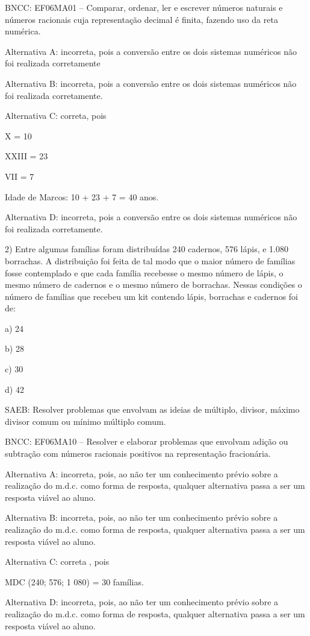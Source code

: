 BNCC: EF06MA01 -- Comparar, ordenar, ler e escrever números naturais e
números racionais cuja representação decimal é finita, fazendo uso da
reta numérica.

Alternativa A: incorreta, pois a conversão entre os dois sistemas
numéricos não foi realizada corretamente

Alternativa B: incorreta, pois a conversão entre os dois sistemas
numéricos não foi realizada corretamente.

Alternativa C: correta, pois

X = 10

XXIII = 23

VII = 7

Idade de Marcos: 10 + 23 + 7 = 40 anos.

Alternativa D: incorreta, pois a conversão entre os dois sistemas
numéricos não foi realizada corretamente.

2) Entre algumas famílias foram distribuídas 240 cadernos, 576 lápis, e
1.080 borrachas. A distribuição foi feita de tal modo que o maior número
de famílias fosse contemplado e que cada família recebesse o mesmo
número de lápis, o mesmo número de cadernos e o mesmo número de
borrachas. Nessas condições o número de famílias que recebeu um kit
contendo lápis, borrachas e cadernos foi de:

a) 24

b) 28

c) 30

d) 42

SAEB: Resolver problemas que envolvam as ideias de múltiplo, divisor,
máximo divisor comum ou mínimo múltiplo comum.

BNCC: EF06MA10 -- Resolver e elaborar problemas que envolvam adição ou
subtração com números racionais positivos na representação fracionária.

Alternativa A: incorreta, pois, ao não ter um conhecimento prévio sobre
a realização do m.d.c. como forma de resposta, qualquer alternativa
passa a ser um resposta viável ao aluno.

Alternativa B: incorreta, pois, ao não ter um conhecimento prévio sobre
a realização do m.d.c. como forma de resposta, qualquer alternativa
passa a ser um resposta viável ao aluno.

Alternativa C: correta , pois

MDC (240; 576; 1 080) = 30 famílias.

Alternativa D: incorreta, pois, ao não ter um conhecimento prévio sobre
a realização do m.d.c. como forma de resposta, qualquer alternativa
passa a ser um resposta viável ao aluno.

